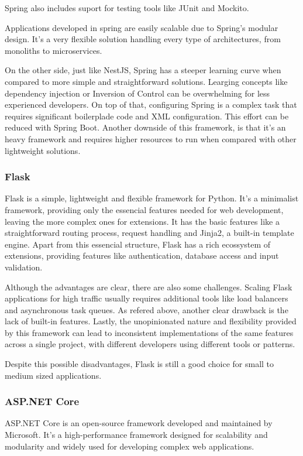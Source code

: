 Spring also includes suport for testing tools like JUnit and Mockito.

Applications developed in spring are easily scalable due to Spring's modular
design.
It's a very flexible solution handling every type of architectures, from
monoliths to microservices.

On the other side, just like NestJS, Spring has a steeper learning curve when
compared to more simple and straightforward solutions. Learging concepts like
dependency injection or Inversion of Control can be overwhelming for less
experienced developers.
On top of that, configuring Spring is a complex task that requires significant
boilerplade code and XML configuration. This effort can be reduced with Spring
Boot.
Another downside of this framework, is that it's an heavy framework and
requires higher resources to run when compared with other lightweight solutions.

\subsubsection{Flask}
Flask is a simple, lightweight and flexible framework for Python. It's a
minimalist framework, providing only the essencial features needed for
web development, leaving the more complex ones for extensions. It has the basic
features like a straightforward routing process, request handling and Jinja2,
a built-in template engine. Apart from this essencial structure, Flask has a
rich ecossystem of extensions, providing features like authentication,
database access and input validation.

Although the advantages are clear, there are also some challenges. Scaling
Flask applications for high traffic usually requires additional tools like load
balancers and asynchronous task queues. As refered above, another clear
drawback is the lack of built-in features. Lastly, the unopinionated nature and
flexibility provided by this framework can lead to inconsistent implementations
of the same features across a single project, with different developers using
different tools or patterns.

Despite this possible disadvantages, Flask is still a good choice for small to
medium sized applications.

\subsubsection{ASP.NET Core}
ASP.NET Core is an open-source framework developed and maintained by Microsoft.
It's a high-performance framework designed for scalability and modularity and
widely used for developing complex web applications.

